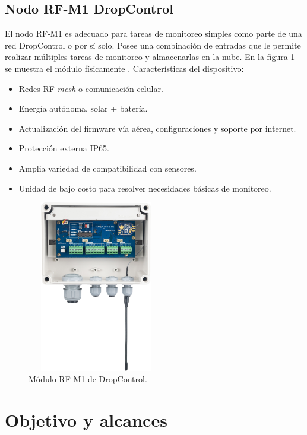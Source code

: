 \subsection{Nodo RF-M1 DropControl}

El nodo RF-M1 es adecuado para tareas de monitoreo simples como parte de una red DropControl o por sí solo. Posee una combinación de entradas que le permite realizar múltiples tareas de monitoreo y almacenarlas en la nube. En la figura \ref{fig:Modulo-Dropcontrol} se muestra el módulo físicamente \citep{ModuloAgricultureDos}.
Características del dispositivo: 
\begin{itemize}
  \item Redes RF \textit{mesh} o comunicación celular.
  \item Energía autónoma, solar + batería.
  \item Actualización del firmware vía aérea, configuraciones y soporte por internet.
  \item Protección externa IP65.
  \item Amplia variedad de compatibilidad con sensores.
  \item Unidad de bajo costo para resolver necesidades básicas de monitoreo. 
\end{itemize}

\begin{figure}[htbp]
	\centering
	\includegraphics[width=6cm, height=7.5cm]{./Figures/modulo_dropcontrol.png}
	\caption{Módulo RF-M1 de DropControl.}
	\label{fig:Modulo-Dropcontrol}
\end{figure}

\section{Objetivo y alcances}

